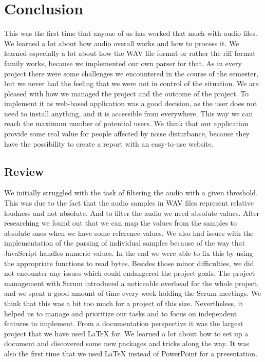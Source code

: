 \section{Conclusion}
This was the first time that anyone of us has worked that much with audio files. We learned a lot about how audio overall works and how to process it.
We learned especially a lot about how the WAV file format or rather the riff format family works, because we implemented our own parser for that.
As in every project there were some challenges we encountered in the course of the semester, but we never had the feeling that we were not in control of the situation.
We are pleased with how we managed the project and the outcome of the project. To implement it as web-based application was a good decision, as the user does not need
to install anything, and it is accessible from everywhere. This way we can reach the maximum number of potential users.
We think that our application provide some real value for people affected by noise disturbance, because they have the possibility to create a report
with an easy-to-use website.

\subsection{Review}
We initially struggled with the task of filtering the audio with a given threshold. This was due to the fact that the audio samples in WAV files represent
relative loudness and not absolute. And to filter the audio we need absolute values. After researching we found out that we can map the values from the
samples to absolute ones when we have some reference values. 
We also had issues with the implementation of the parsing of individual samples because of the way that JavaScript handles numeric values.
In the end we were able to fix this by using the appropriate functions to read bytes. Besides those minor difficulties, we did not encounter any issues which
could endangered the project goals. 
The project management with Scrum introduced a noticeable overhead for the whole project, and we spent a good amount of time every week holding the Scrum meetings.
We think that this was a bit too much for a project of this size. Nevertheless, it helped us to manage and prioritize our tasks and to focus on independent features to implement. 
From a documentation perspective it was the largest project that we have used LaTeX for. We learned a lot about how to set up a document and discovered some new
packages and tricks along the way. It was also the first time that we used LaTeX instead of PowerPoint for a presentation.

